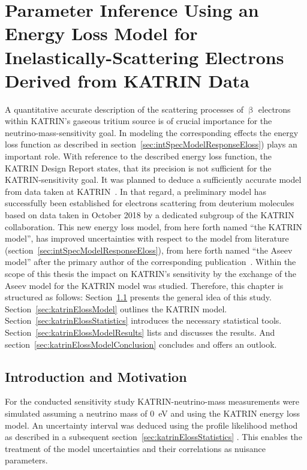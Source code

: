 \def\currentRootFolder{chapter/sensitivityStudyWithPreliminaryKatrinElossModel}
\def\currentFigureFolder{\currentRootFolder/fig}

\chapter{Parameter Inference Using an Energy Loss Model for Inelastically-Scattering Electrons Derived from KATRIN Data}
\label{sec:katrinEloss}
A quantitative accurate description of the scattering processes of $\upbeta$ electrons within KATRIN's gaseous tritium source is of crucial importance for the neutrino-mass-sensitivity goal. In modeling the corresponding effects the energy loss function as described in section~\ref{sec:intSpecModelResponseEloss}) plays an important role. With reference to the described energy loss function, the KATRIN Design Report states, that its precision is not sufficient for the KATRIN-sensitivity goal. It was planned to deduce a sufficiently accurate model from data taken at KATRIN~\cite{Angrik:2005ep}. In that regard, a preliminary model has successfully been established for electrons scattering from deuterium molecules based on data taken in October 2018 by a dedicated subgroup of the KATRIN collaboration. This new energy loss model, from here forth named ``the KATRIN model'', has improved uncertainties with respect to the model from literature (section~\ref{sec:intSpecModelResponseEloss}), from here forth named ``the Aseev model'' after the primary author of the corresponding publication~\cite{Aseev2000}. Within the scope of this thesis the impact on KATRIN's sensitivity by the exchange of the Aseev model for the KATRIN model was studied. Therefore, this chapter is structured as follows: Section~\ref{sec:katrinElossConcept} presents the general idea of this study. Section~\ref{sec:katrinElossModel} outlines the KATRIN model. Section~\ref{sec:katrinElossStatistics} introduces the necessary statistical tools. Section~\ref{sec:katrinElossModelResults} lists and discusses the results. And section~\ref{sec:katrinElossModelConclusion} concludes and offers an outlook.

\section{Introduction and Motivation}
\label{sec:katrinElossConcept}
For the conducted sensitivity study KATRIN-neutrino-mass measurements were simulated assuming a neutrino mass of \SI{0}{eV} and using the KATRIN energy loss model. An uncertainty interval was deduced using the profile likelihood method as described in a subsequent section~\ref{sec:katrinElossStatistics} . This enables the treatment of the model uncertainties and their correlations as nuisance parameters.

